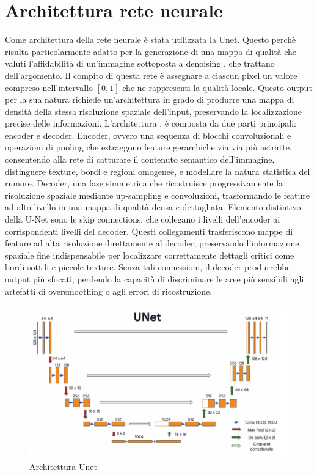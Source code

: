 \section{Architettura rete neurale}
Come architettura della rete neurale è stata utilizzata la Unet. Questo perchè risulta particolarmente adatto per la 
generazione di una mappa di qualità che valuti l'affidabilità di un'immagine sottoposta a denoising \cite{Vyver2025}. che trattano dell'argomento. Il compito di 
questa rete è assegnare a ciascun pixel un valore compreso nell'intervallo $[0,1]$ che ne rappresenti la 
qualità locale. Questo output per la sua natura richiede un'architettura in grado di produrre una mappa di densità 
della stessa risoluzione spaziale dell'input, preservando la localizzazione precise delle informazioni. 
L'architettura \cite{ronneberger2015unetconvolutionalnetworksbiomedical}, è composta da due parti principali: encoder e decoder. 
Encoder, ovvero una sequenza di blocchi convoluzionali e operazioni di pooling che estraggono feature 
gerarchiche via via più astratte, consentendo alla rete di catturare il contenuto semantico dell’immagine, 
distinguere texture, bordi e regioni omogenee, e modellare la natura statistica del rumore.
Decoder, una fase simmetrica che ricostruisce progressivamente la risoluzione spaziale 
mediante up-sampling e convoluzioni, trasformando le feature ad alto livello in una mappa di 
qualità densa e dettagliata.
Elemento distintivo della U-Net sono le skip connections, che collegano i livelli dell’encoder ai corrispondenti 
livelli del decoder. Questi collegamenti trasferiscono mappe di feature ad alta risoluzione direttamente al decoder, 
preservando l’informazione spaziale fine indispensabile per localizzare correttamente dettagli critici come bordi 
sottili e piccole texture. Senza tali connessioni, il decoder produrrebbe output più sfocati, perdendo la capacità 
di discriminare le aree più sensibili agli artefatti di oversmoothing o agli errori di ricostruzione.
\begin{figure}[H]
  \centering
  \includegraphics[width=\textwidth]{utils/unet.png}
  \caption{Architettura Unet}
  \label{fig:ArchitetturaUnet}
\end{figure}
